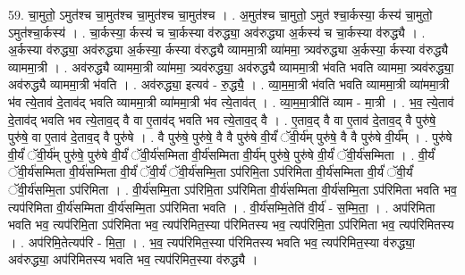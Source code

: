 \documentclass[17pt]{extarticle}
\begin{document}
59. चा॒मुतो॒ ऽमुत॑श्च चा॒मुत॑श्च चा॒मुत॑श्च चा॒मुत॑श्च । . अ॒मुत॑श्च चा॒मुतो॒ ऽमुत॑ श्चा॒र्कस्या॒ र्कस्य॑ चा॒मुतो॒ ऽमुत॑श्चा॒र्कस्य॑ । . चा॒र्कस्या॒ र्कस्य॑ च चा॒र्कस्या व॑रुद्ध्या॒ अव॑रुद्ध्या अ॒र्कस्य॑ च चा॒र्कस्या व॑रुद्ध्यै । . अ॒र्कस्या व॑रुद्ध्या॒ अव॑रुद्ध्या अ॒र्कस्या॒ र्कस्या व॑रुद्ध्यै व्याममा॒त्री व्या॑ममा॒ त्र्यव॑रुद्ध्या अ॒र्कस्या॒ र्कस्या व॑रुद्ध्यै व्याममा॒त्री । . अव॑रुद्ध्यै व्याममा॒त्री व्या॑ममा॒ त्र्यव॑रुद्ध्या॒ अव॑रुद्ध्यै व्याममा॒त्री भ॑वति भवति व्याममा॒ त्र्यव॑रुद्ध्या॒ अव॑रुद्ध्यै व्याममा॒त्री भ॑वति । . अव॑रुद्ध्या॒ इत्यव॑ - रु॒द्ध्यै॒ । . व्या॒म॒मा॒त्री भ॑वति भवति व्याममा॒त्री व्या॑ममा॒त्री भ॑व त्ये॒ताव॑ दे॒ताव॑द् भवति व्याममा॒त्री व्या॑ममा॒त्री भ॑व त्ये॒ताव॑त् । . व्या॒म॒मा॒त्रीति॑ व्याम - मा॒त्री । . भ॒व॒ त्ये॒ताव॑ दे॒ताव॑द् भवति भव त्ये॒ताव॒द् वै वा ए॒ताव॑द् भवति भव त्ये॒ताव॒द् वै । . ए॒ताव॒द् वै वा ए॒ताव॑ दे॒ताव॒द् वै पुरु॑षे॒ पुरु॑षे॒ वा ए॒ताव॑ दे॒ताव॒द् वै पुरु॑षे । . वै पुरु॑षे॒ पुरु॑षे॒ वै वै पुरु॑षे वी॒र्यं॑ ॅवी॒र्य॑म् पुरु॑षे॒ वै वै पुरु॑षे वी॒र्य᳚म् । . पुरु॑षे वी॒र्यं॑ ॅवी॒र्य॑म् पुरु॑षे॒ पुरु॑षे वी॒र्यं॑ ॅवी॒र्य॑सम्मिता वी॒र्य॑सम्मिता वी॒र्य॑म् पुरु॑षे॒ पुरु॑षे वी॒र्यं॑ ॅवी॒र्य॑सम्मिता । . वी॒र्यं॑ ॅवी॒र्य॑सम्मिता वी॒र्य॑सम्मिता वी॒र्यं॑ ॅवी॒र्यं॑ ॅवी॒र्य॑सम्मि॒ता ऽप॑रिमि॒ता ऽप॑रिमिता वी॒र्य॑सम्मिता वी॒र्यं॑ ॅवी॒र्यं॑ ॅवी॒र्य॑सम्मि॒ता ऽप॑रिमिता । . वी॒र्य॑सम्मि॒ता ऽप॑रिमि॒ता ऽप॑रिमिता वी॒र्य॑सम्मिता वी॒र्य॑सम्मि॒ता ऽप॑रिमिता भवति भव॒ त्यप॑रिमिता वी॒र्य॑सम्मिता वी॒र्य॑सम्मि॒ता ऽप॑रिमिता भवति । . वी॒र्य॑सम्मि॒तेति॑ वी॒र्य॑ - स॒म्मि॒ता॒ । . अप॑रिमिता भवति भव॒ त्यप॑रिमि॒ता ऽप॑रिमिता भव॒ त्यप॑रिमित॒स्या प॑रिमितस्य भव॒ त्यप॑रिमि॒ता ऽप॑रिमिता भव॒ त्यप॑रिमितस्य । . अप॑रिमि॒तेत्यप॑रि - मि॒ता॒ । . भ॒व॒ त्यप॑रिमित॒स्या प॑रिमितस्य भवति भव॒ त्यप॑रिमित॒स्या व॑रुद्ध्या॒ अव॑रुद्ध्या॒ अप॑रिमितस्य भवति भव॒ त्यप॑रिमित॒स्या व॑रुद्ध्यै । \newline
\end{document}
